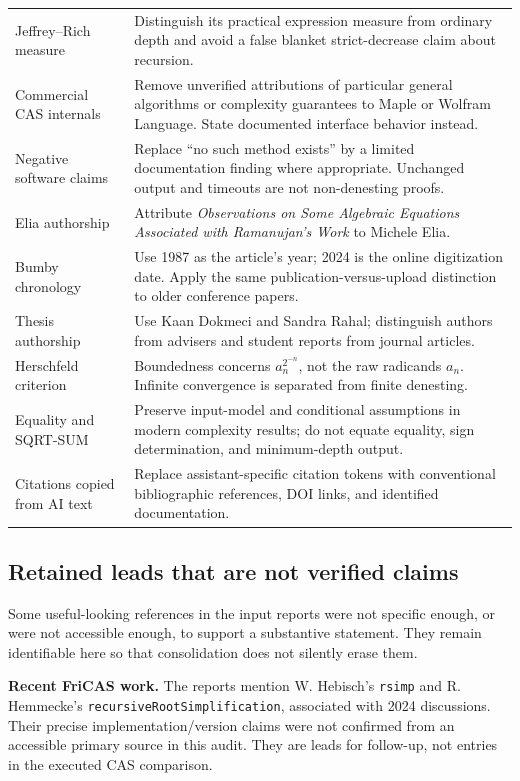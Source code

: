 \documentclass[11pt,a4paper]{article}
\theoremstyle{definition}
\theoremstyle{remark}
\numberwithin{equation}{section}
\begin{document}
\begin{longtable}{P{0.27\textwidth}P{0.66\textwidth}}
Jeffrey--Rich measure & Distinguish its practical expression measure from ordinary depth and avoid a false blanket strict-decrease claim about recursion.\\
Commercial CAS internals & Remove unverified attributions of particular general algorithms or complexity guarantees to Maple or Wolfram Language. State documented interface behavior instead.\\
Negative software claims & Replace ``no such method exists'' by a limited documentation finding where appropriate. Unchanged output and timeouts are not non-denesting proofs.\\
Elia authorship & Attribute \emph{Observations on Some Algebraic Equations Associated with Ramanujan's Work} to Michele Elia.\\
Bumby chronology & Use 1987 as the article's year; 2024 is the online digitization date. Apply the same publication-versus-upload distinction to older conference papers.\\
Thesis authorship & Use Kaan Dokmeci and Sandra Rahal; distinguish authors from advisers and student reports from journal articles.\\
Herschfeld criterion & Boundedness concerns $a_n^{2^{-n}}$, not the raw radicands $a_n$. Infinite convergence is separated from finite denesting.\\
Equality and SQRT-SUM & Preserve input-model and conditional assumptions in modern complexity results; do not equate equality, sign determination, and minimum-depth output.\\
Citations copied from AI text & Replace assistant-specific citation tokens with conventional bibliographic references, DOI links, and identified documentation.\\
\bottomrule
\end{longtable}

\subsection{Retained leads that are not verified claims}

Some useful-looking references in the input reports were not specific enough, or were not accessible enough, to support a substantive statement. They remain identifiable here so that consolidation does not silently erase them.

\textbf{Recent FriCAS work.} The reports mention W. Hebisch's \texttt{rsimp} and R. Hemmecke's \texttt{recursiveRootSimplification}, associated with 2024 discussions. Their precise implementation/version claims were not confirmed from an accessible primary source in this audit. They are leads for follow-up, not entries in the executed CAS comparison.
\end{document}
